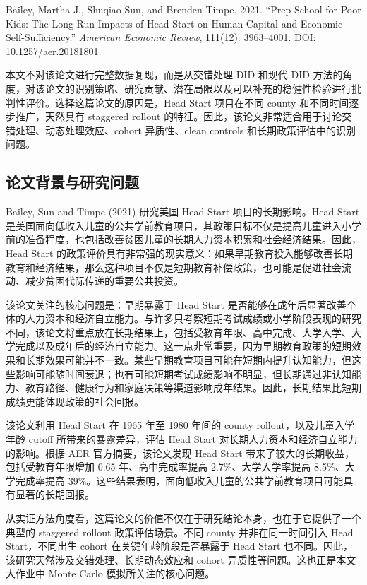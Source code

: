 \documentclass[
  fontset=windows]{ctexart}
\begin{document}
Bailey, Martha J., Shuqiao Sun, and Brenden Timpe. 2021. ``Prep School
for Poor Kids: The Long-Run Impacts of Head Start on Human Capital and
Economic Self-Sufficiency.'' \emph{American Economic Review}, 111(12):
3963--4001. DOI: 10.1257/aer.20181801.

本文不对该论文进行完整数据复现，而是从交错处理 DID 和现代 DID
方法的角度，对该论文的识别策略、研究贡献、潜在局限以及可以补充的稳健性检验进行批判性评价。选择这篇论文的原因是，Head
Start 项目在不同 county 和不同时间逐步推广，天然具有 staggered rollout
的特征。因此，该论文非常适合用于讨论交错处理、动态处理效应、cohort
异质性、clean controls 和长期政策评估中的识别问题。

\subsection{论文背景与研究问题}\label{ux8bbaux6587ux80ccux666fux4e0eux7814ux7a76ux95eeux9898}

Bailey, Sun and Timpe (2021) 研究美国 Head Start 项目的长期影响。Head
Start
是美国面向低收入儿童的公共学前教育项目，其政策目标不仅是提高儿童进入小学前的准备程度，也包括改善贫困儿童的长期人力资本积累和社会经济结果。因此，Head
Start
的政策评价具有非常强的现实意义：如果早期教育投入能够改善长期教育和经济结果，那么这种项目不仅是短期教育补偿政策，也可能是促进社会流动、减少贫困代际传递的重要公共投资。

该论文关注的核心问题是：早期暴露于 Head Start
是否能够在成年后显著改善个体的人力资本和经济自立能力。与许多只考察短期考试成绩或小学阶段表现的研究不同，该论文将重点放在长期结果上，包括受教育年限、高中完成、大学入学、大学完成以及成年后的经济自立能力。这一点非常重要，因为早期教育政策的短期效果和长期效果可能并不一致。某些早期教育项目可能在短期内提升认知能力，但这些影响可能随时间衰退；也有可能短期考试成绩影响不明显，但长期通过非认知能力、教育路径、健康行为和家庭决策等渠道影响成年结果。因此，长期结果比短期成绩更能体现政策的社会回报。

该论文利用 Head Start 在 1965 年至 1980 年间的 county
rollout，以及儿童入学年龄 cutoff 所带来的暴露差异，评估 Head Start
对长期人力资本和经济自立能力的影响。根据 AER 官方摘要，该论文发现 Head
Start 带来了较大的长期收益，包括受教育年限增加 0.65 年、高中完成率提高
2.7\%、大学入学率提高 8.5\%、大学完成率提高
39\%。这些结果表明，面向低收入儿童的公共学前教育项目可能具有显著的长期回报。

从实证方法角度看，这篇论文的价值不仅在于研究结论本身，也在于它提供了一个典型的
staggered rollout 政策评估场景。不同 county 并非在同一时间引入 Head
Start，不同出生 cohort 在关键年龄阶段是否暴露于 Head Start
也不同。因此，该研究天然涉及交错处理、长期动态效应和 cohort
异质性等问题。这也正是本文大作业中 Monte Carlo 模拟所关注的核心问题。
\end{document}
